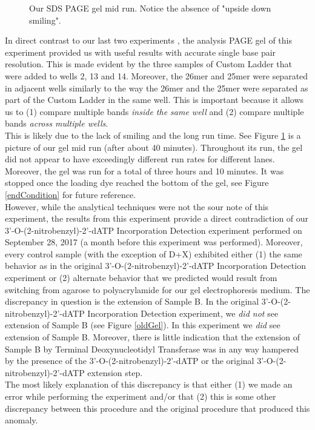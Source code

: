 \documentclass[letterpaper]{article}
\newcommand{\tdt}{Terminal Deoxynucleotidyl Transferase}
\newcommand{\BdATP}{3'-O-(2-nitrobenzyl)-2'-dATP}
\begin{document}
\begin{figure}
\centering
\caption{Our SDS PAGE gel mid run. Notice the absence of "upside down smiling".}
\label{noSmile}
\end{figure}

In direct contrast to our last two experiments , the analysis PAGE gel of this experiment provided us with useful results with accurate single base pair resolution.
This is made evident by the three samples of Custom Ladder that were added to wells 2, 13 and 14. Moreover, the 26mer and 25mer were separated in adjacent wells similarly to the way the 26mer and the 25mer were separated as part of the Custom Ladder in the same well. This is important because it allows us to (1) compare multiple bands \textit{inside the same well} and (2) compare multiple bands \textit{across multiple wells}.\\
This is likely due to the lack of smiling and the long run time. See Figure \ref{noSmile} is a picture of our gel mid run (after about 40 minutes). Throughout its run, the gel did not appear to have exceedingly different run rates for different lanes.
Moreover, the gel was run for a total of three hours and 10 minutes. It was stopped once the loading dye reached the bottom of the gel, see Figure \ref{endCondition} for future reference.\\
However, while the analytical techniques were not the sour note of this experiment, the results from this experiment provide a direct contradiction of our \BdATP{} Incorporation Detection experiment performed on September 28, 2017 (a month before this experiment was performed). Moreover, every control sample (with the exception of D+X) exhibited either (1) the same behavior as in the original \BdATP{} Incorporation Detection experiment or (2) alternate behavior that we predicted would result from switching from agarose to polyacrylamide for our gel electrophoresis medium. The discrepancy in question is the extension of Sample B. In the original \BdATP{} Incorporation Detection experiment, we \textit{did not} see extension of Sample B (see Figure \ref{oldGel}). In this experiment we \textit{did} see extension of Sample B. Moreover, there is little indication that the extension of Sample B by \tdt{} was in any way hampered by the presence of the \BdATP{} or the original \BdATP{} extension step.\\

The most likely explanation of this discrepancy is that either (1) we made an error while performing the experiment and/or that (2) this is some other discrepancy between this procedure and the original procedure that produced this anomaly. \\
\end{document}
